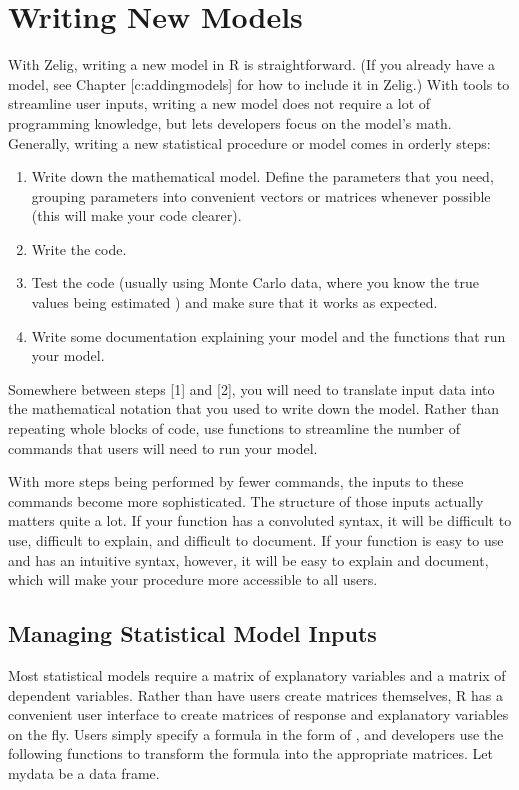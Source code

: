 \documentclass[letterpaper,10pt,english]{sphinxmanual}
\begin{document}
\chapter{Writing New Models}
\label{8_writing_new_models:writing-new-models}\label{8_writing_new_models::doc}
With Zelig, writing a new model in R is straightforward. (If you already
have a model, see Chapter {[}c:addingmodels{]} for how to include it in
Zelig.) With tools to streamline user inputs, writing a new model does
not require a lot of programming knowledge, but lets developers focus on
the model’s math. Generally, writing a new statistical procedure or
model comes in orderly steps:
\begin{enumerate}
\item {} 
Write down the mathematical model. Define the parameters that you
need, grouping parameters into convenient vectors or matrices
whenever possible (this will make your code clearer).

\item {} 
Write the code.

\item {} 
Test the code (usually using Monte Carlo data, where you know the
true values being estimated ) and make sure that it works as
expected.

\item {} 
Write some documentation explaining your model and the functions that
run your model.

\end{enumerate}

Somewhere between steps {[}1{]} and {[}2{]}, you will need to translate input
data into the mathematical notation that you used to write down the
model. Rather than repeating whole blocks of code, use functions to
streamline the number of commands that users will need to run your
model.

With more steps being performed by fewer commands, the inputs to these
commands become more sophisticated. The structure of those inputs
actually matters quite a lot. If your function has a convoluted syntax,
it will be difficult to use, difficult to explain, and difficult to
document. If your function is easy to use and has an intuitive syntax,
however, it will be easy to explain and document, which will make your
procedure more accessible to all users.


\section{Managing Statistical Model Inputs}
\label{8_writing_new_models:managing-statistical-model-inputs}
Most statistical models require a matrix of explanatory variables and a
matrix of dependent variables. Rather than have users create matrices
themselves, R has a convenient user interface to create matrices of
response and explanatory variables on the fly. Users simply specify a
formula in the form of , and
developers use the following functions to transform the formula into the
appropriate matrices. Let mydata be a data frame.
\end{document}
